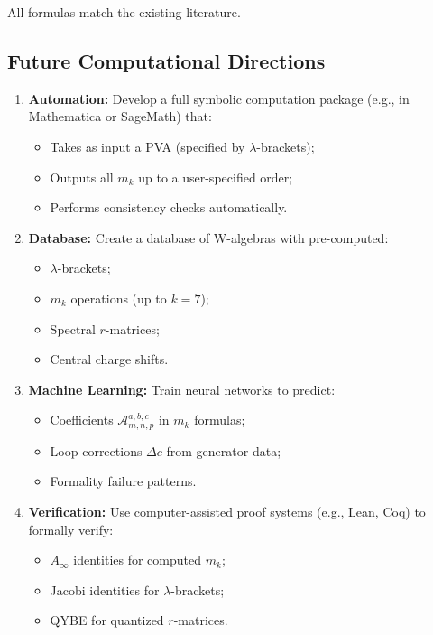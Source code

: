 All formulas match the existing literature.

\subsection{Future Computational Directions}

\begin{enumerate}
\item \textbf{Automation:} Develop a full symbolic computation package (e.g., in Mathematica or SageMath) that:
\begin{itemize}
\item Takes as input a PVA (specified by $\lambda$-brackets);
\item Outputs all $m_k$ up to a user-specified order;
\item Performs consistency checks automatically.
\end{itemize}

\item \textbf{Database:} Create a database of W-algebras with pre-computed:
\begin{itemize}
\item $\lambda$-brackets;
\item $m_k$ operations (up to $k=7$);
\item Spectral $r$-matrices;
\item Central charge shifts.
\end{itemize}

\item \textbf{Machine Learning:} Train neural networks to predict:
\begin{itemize}
\item Coefficients $\mathcal{A}^{a,b,c}_{m,n,p}$ in $m_k$ formulas;
\item Loop corrections $\Delta c$ from generator data;
\item Formality failure patterns.
\end{itemize}

\item \textbf{Verification:} Use computer-assisted proof systems (e.g., Lean, Coq) to formally verify:
\begin{itemize}
\item $A_\infty$ identities for computed $m_k$;
\item Jacobi identities for $\lambda$-brackets;
\item QYBE for quantized $r$-matrices.
\end{itemize}
\end{enumerate}

